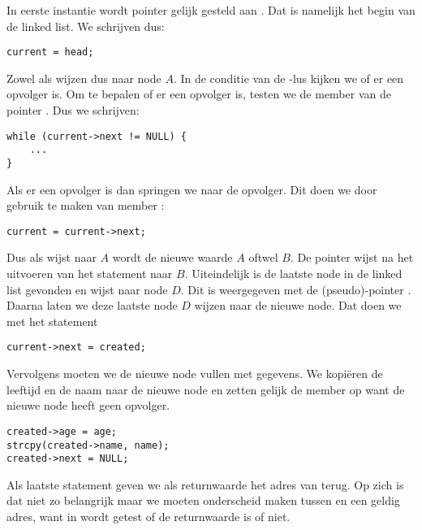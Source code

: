 In eerste instantie wordt pointer  gelijk gesteld aan . Dat is namelijk het begin van de linked list. We schrijven dus:

\begin{lstlisting}[style=lstoneline]
current = head;
\end{lstlisting}


Zowel  als  wijzen dus naar node $A$. In de conditie van de -lus kijken we of er een opvolger is. Om te bepalen of er een opvolger is, testen we de member  van de pointer . Dus we schrijven:

\begin{lstlisting}[style=lstoneline]
while (current->next != NULL) {
    ...
}
\end{lstlisting}

Als er een opvolger is dan springen we naar de opvolger. Dit doen we door gebruik te maken van member :

\begin{lstlisting}[style=lstoneline]
current = current->next;
\end{lstlisting}

Dus als  wijst naar $A$ wordt de nieuwe waarde $A$ oftwel $B$.
De pointer \mbox{} wijst na het uitvoeren van het statement naar $B$. Uiteindelijk is de laatste node in de linked list gevonden en wijst  naar node $D$. Dit is weergegeven met de (pseudo)-pointer . Daarna laten we deze laatste node $D$ wijzen naar de nieuwe node. Dat doen we met het statement

\begin{lstlisting}[style=lstoneline]
current->next = created;
\end{lstlisting}

Vervolgens moeten we de nieuwe node vullen met gegevens. We kopiëren de leeftijd en de naam naar de nieuwe node en zetten gelijk de member  op  want de nieuwe node heeft geen opvolger.

\begin{lstlisting}[style=lstoneline]
created->age = age;
strcpy(created->name, name);
created->next = NULL;
\end{lstlisting}

Als laatste statement geven we als returnwaarde het adres van  terug. Op zich is dat niet zo belangrijk maar we moeten onderscheid maken tussen  en een geldig adres, want in  wordt getest of de returnwaarde  is of niet.

